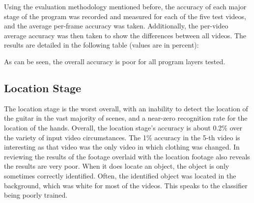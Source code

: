 Using the evaluation methodology mentioned before, the accuracy of each major stage of the program was
recorded and measured for each of the five test videos, and the average per-frame accuracy was taken.
Additionally, the per-video average accuracy was then taken to show the differences between all videos.
The results are detailed in the following table (values are in percent):
\vspace{5mm}

\begin{centering}

\end{centering}
\vspace{5mm}

As can be seen, the overall accuracy is poor for all program layers tested.
\subsection{Location Stage}
The location stage is the worst overall, with an inability to detect the location of the guitar
in the vast majority of scenes, and a near-zero recognition rate for the location of the hands.
Overall, the location stage's accuracy is about 0.2\% over the variety of input video circumstances.
The 1\% accuracy in the 5-th video is interesting as that video was the only video in which clothing was changed.
In reviewing the results of the footage overlaid with the location footage also reveals the results
are very poor. When it does locate an object, the object is only sometimes correctly identified.
Often, the identified object was located in the background, which was white for most of the videos.
This speaks to the classifier being poorly trained.

